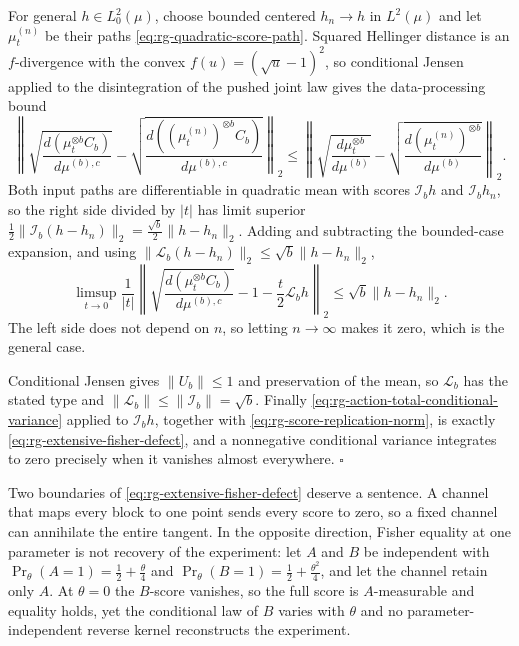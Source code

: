 For general \(h\in L^2_0(\mu)\), choose bounded centered \(h_n\to h\) in
\(L^2(\mu)\) and let \(\mu_t^{(n)}\) be their paths
\eqref{eq:rg-quadratic-score-path}.  Squared Hellinger distance is an
\(f\)-divergence with the convex \(f(u)=(\sqrt u-1)^2\), so conditional Jensen
applied to the disintegration of the pushed joint law gives the data-processing
bound
\begin{equation}
 \left\lVert
 \sqrt{\frac{d(\mu_t^{\otimes b}C_b)}{d\mu^{(b),c}}}
 -\sqrt{\frac{d((\mu_t^{(n)})^{\otimes b}C_b)}{d\mu^{(b),c}}}
 \right\rVert_{2}
 \leq
 \left\lVert
 \sqrt{\frac{d\mu_t^{\otimes b}}{d\mu^{(b)}}}
 -\sqrt{\frac{d(\mu_t^{(n)})^{\otimes b}}{d\mu^{(b)}}}
 \right\rVert_{2}.
 \label{eq:rg-hellinger-contraction}
\end{equation}
Both input paths are differentiable in quadratic mean with scores
\(\mathscr I_bh\) and \(\mathscr I_bh_n\), so the right side divided by
\(\lvert t\rvert\) has limit superior \(\tfrac12\lVert\mathscr I_b(h-h_n)\rVert_2
=\tfrac{\sqrt b}2\lVert h-h_n\rVert_2\).  Adding and subtracting the bounded-case
expansion, and using
\(\lVert\mathscr L_b(h-h_n)\rVert_2\leq\sqrt b\lVert h-h_n\rVert_2\),
\begin{equation}
 \limsup_{t\to0}\frac1{\lvert t\rvert}
 \left\lVert
 \sqrt{\frac{d(\mu_t^{\otimes b}C_b)}{d\mu^{(b),c}}}
 -1-\frac t2\mathscr L_bh
 \right\rVert_2
 \leq\sqrt b\lVert h-h_n\rVert_2 .
 \label{eq:rg-pushed-score-approximation}
\end{equation}
The left side does not depend on \(n\), so letting \(n\to\infty\) makes it zero,
which is the general case.

Conditional Jensen gives \(\lVert U_b\rVert\leq1\) and preservation of the mean,
so \(\mathscr L_b\) has the stated type and
\(\lVert\mathscr L_b\rVert\leq\lVert\mathscr I_b\rVert=\sqrt b\).  Finally
\eqref{eq:rg-action-total-conditional-variance} applied to
\(\mathscr I_bh\), together with
\eqref{eq:rg-score-replication-norm}, is exactly
\eqref{eq:rg-extensive-fisher-defect}, and a nonnegative conditional variance
integrates to zero precisely when it vanishes almost everywhere.
\(\square\)

Two boundaries of \eqref{eq:rg-extensive-fisher-defect} deserve a sentence.  A
channel that maps every block to one point sends every score to zero, so a fixed
channel can annihilate the entire tangent.  In the opposite direction, Fisher
equality at one parameter is not recovery of the experiment: let \(A\) and \(B\)
be independent with \(\Pr_\theta(A=1)=\tfrac12+\tfrac\theta4\) and
\(\Pr_\theta(B=1)=\tfrac12+\tfrac{\theta^2}4\), and let the channel retain only
\(A\).  At \(\theta=0\) the \(B\)-score vanishes, so the full score is
\(A\)-measurable and equality holds, yet the conditional law of \(B\) varies with
\(\theta\) and no parameter-independent reverse kernel reconstructs the
experiment. 

